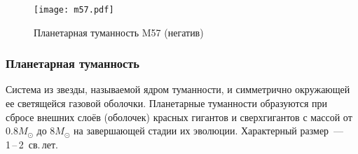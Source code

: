 \begin{wrapfigure}[7]{r}{0.32\tw}
    \vspace{-1pc}
    \centering
    \texttt{[image: m57.pdf]}
    \caption{Пла\-не\-тар\-ная туманность M57 (негатив)}
\end{wrapfigure}
\subsubsection*{Планетарная туманность}
 Система из звезды, называемой ядром туманности, и симметрично окружающей ее светящейся газовой оболочки. Планетарные туманности образуются при сбросе внешних слоёв (оболочек) красных гигантов и сверхгигантов с массой от $0.8M_\odot$ до $8M_\odot$ на завершающей стадии их эволюции. Характерный размер~--- 1\,--\,2~св.\,лет.
